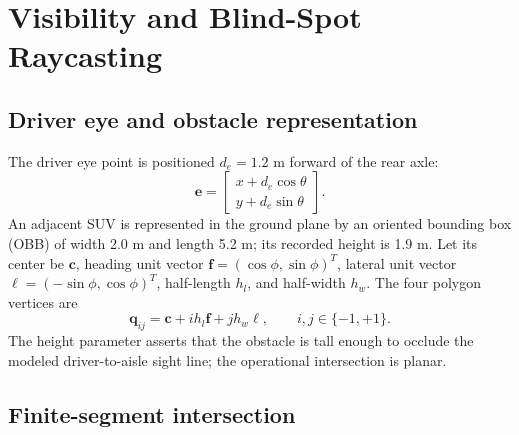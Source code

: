 \documentclass[11pt]{article}
\newcommand{\vect}[1]{\boldsymbol{#1}}
\begin{document}
\section{Visibility and Blind-Spot Raycasting}

\subsection{Driver eye and obstacle representation}

The driver eye point is positioned $d_e=1.2$ m forward of the rear axle:
\begin{equation}
  \vect{e}=\begin{bmatrix}x+d_e\cos\theta\\y+d_e\sin\theta\end{bmatrix}.
\end{equation}
An adjacent SUV is represented in the ground plane by an oriented bounding box (OBB) of width 2.0 m and length 5.2 m; its recorded height is 1.9 m. Let its center be $\vect{c}$, heading unit vector $\vect{f}=(\cos\phi,\sin\phi)^T$, lateral unit vector $\vect{\ell}=(-\sin\phi,\cos\phi)^T$, half-length $h_l$, and half-width $h_w$. The four polygon vertices are
\begin{equation}
  \vect{q}_{ij}=\vect{c}+i h_l\vect{f}+j h_w\vect{\ell},
  \qquad i,j\in\{-1,+1\}.
\end{equation}
The height parameter asserts that the obstacle is tall enough to occlude the modeled driver-to-aisle sight line; the operational intersection is planar.

\subsection{Finite-segment intersection}
\end{document}
